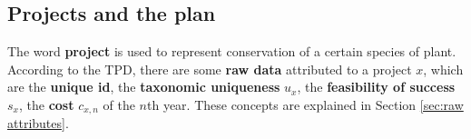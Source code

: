 \documentclass{article}
\begin{document}

\subsection{Projects and the plan}
\label{sec:projects and the plan}

The word \textbf{project} is used to represent conservation of a certain species of plant.
According to the TPD, there are some \textbf{raw data} attributed to a project $x$, which are
the \textbf{unique id}, the \textbf{taxonomic uniqueness} $u_x$, the \textbf{feasibility of success} $s_x$, the \textbf{cost} $c_{x,n}$ of the $n$th year.
These concepts are explained in Section \ref{sec:raw attributes}.
\end{document}
